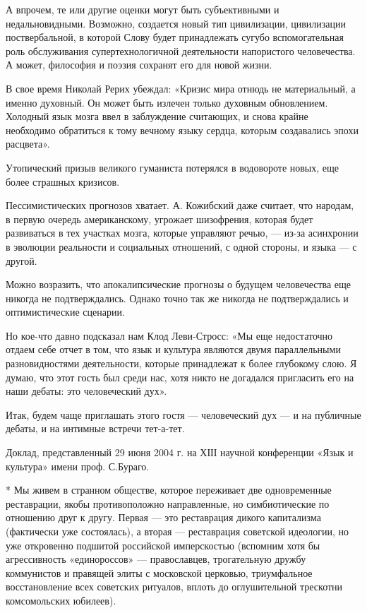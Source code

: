 А впрочем, те или другие оценки могут быть субъективными и недальновидными.
Возможно, создается новый тип цивилизации, цивилизации поствербальной, в
которой Слову будет принадлежать сугубо вспомогательная роль обслуживания
супертехнологичной деятельности напористого человечества. А может, философия и
поэзия сохранят его для новой жизни.

В свое время Николай Рерих убеждал: «Кризис мира отнюдь не материальный, а
именно духовный. Он может быть излечен только духовным обновлением. Холодный
язык мозга ввел в заблуждение считающих, и снова крайне необходимо обратиться к
тому вечному языку сердца, которым создавались эпохи расцвета».

Утопический призыв великого гуманиста потерялся в водовороте новых, еще более
страшных кризисов.

Пессимистических прогнозов хватает. А. Кожибский даже считает, что народам, в
первую очередь американскому, угрожает шизофрения, которая будет развиваться в
тех участках мозга, которые управляют речью, — из-за асинхронии в эволюции
реальности и социальных отношений, с одной стороны, и языка — с другой.

Можно возразить, что апокалипсические прогнозы о будущем человечества еще
никогда не подтверждались. Однако точно так же никогда не подтверждались и
оптимистические сценарии.

Но кое-что давно подсказал нам Клод Леви-Стросс: «Мы еще недостаточно отдаем
себе отчет в том, что язык и культура являются двумя параллельными
разновидностями деятельности, которые принадлежат к более глубокому слою. Я
думаю, что этот гость был среди нас, хотя никто не догадался пригласить его на
наши дебаты: это человеческий дух».

Итак, будем чаще приглашать этого гостя — человеческий дух — и на публичные
дебаты, и на интимные встречи тет-а-тет.

Доклад, представленный 29 июня 2004 г. на ХІІІ научной конференции «Язык и
культура» имени проф. С.Бураго.

* Мы живем в странном обществе, которое переживает две одновременные
реставрации, якобы противоположно направленные, но симбиотические по отношению
друг к другу. Первая — это реставрация дикого капитализма (фактически уже
состоялась), а вторая — реставрация советской идеологии, но уже откровенно
подшитой российской имперскостью (вспомним хотя бы агрессивность «единороссов»
— православцев, трогательную дружбу коммунистов и правящей элиты с московской
церковью, триумфальное восстановление всех советских ритуалов, вплоть до
оглушительной трескотни комсомольских юбилеев).
